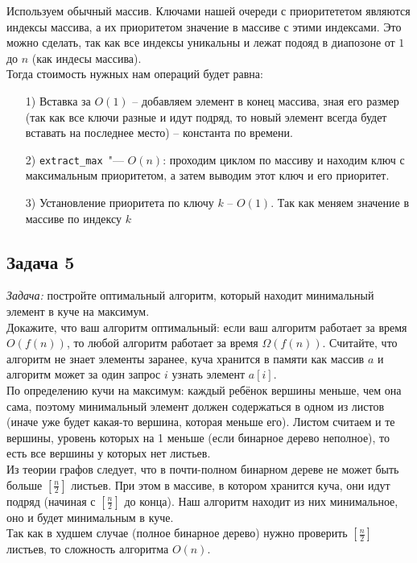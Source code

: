 \documentclass[a4paper,12pt]{article} %
\begin{document}
Используем обычный массив. Ключами нашей очереди с приоритететом являются индексы массива, а их приоритетом значение в массиве с этими индексами. Это можно сделать, так как все индексы уникальны и лежат подояд в диапозоне от $1$ до $n$ (как индесы массива).\\
Тогда стоимость нужных нам операций будет равна:
\begin{itemize}
\item[1) ] Вставка за $O(1)$ -- добавляем элемент в конец массива, зная его размер (так как все ключи разные и идут подряд, то новый элемент всегда будет вставать на последнее место) -- константа по времени.
\item[2) ] \texttt{extract\_max}~"--- $O(n)$: проходим циклом по массиву и находим ключ с максимальным приоритетом, а затем выводим этот ключ и его приоритет.
\item[3) ] Установление приоритета по ключу $ k $ -- $O(1)$. Так как меняем значение в массиве по индексу $ k $
\end{itemize}



\subsection*{Задача 5}
\textit{Задача:} постройте оптимальный алгоритм, который находит минимальный элемент в куче на максимум.\\

Докажите, что ваш алгоритм оптимальный: если ваш алгоритм работает за время $O(f(n))$, то любой алгоритм работает за время $\Omega(f(n))$. Считайте, что алгоритм не знает элементы заранее, куча хранится в памяти как массив $a$ и алгоритм может за один запрос $i$ узнать элемент $a[i]$.\\

По определению кучи на максимум: каждый ребёнок вершины меньше, чем она сама, поэтому минимальный элемент должен содержаться в одном из листов (иначе уже будет какая-то вершина, которая меньше его). Листом считаем и те вершины, уровень которых на 1 меньше (если бинарное дерево неполное), то есть все вершины у которых нет листьев.\\
Из теории графов следует, что в почти-полном бинарном дереве не может быть больше $ \left[ \frac{n}{2} \right] $ листьев. При этом в массиве, в котором хранится куча, они идут подряд (начиная с $ \left[ \frac{n}{2} \right] $ до конца). Наш алгоритм находит из них минимальное, оно и будет минимальным в куче.\\
Так как в худшем случае (полное бинарное дерево) нужно проверить $ \left[ \frac{n}{2} \right] $ листьев, то сложность алгоритма $ O(n) $. \\
\end{document}
